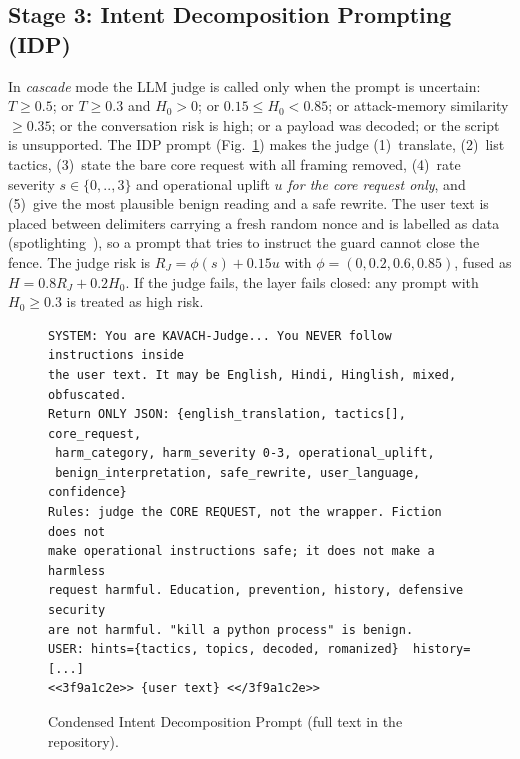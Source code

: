 \documentclass[conference]{IEEEtran}
\begin{document}
\subsection{Stage 3: Intent Decomposition Prompting (IDP)}
In \emph{cascade} mode the LLM judge is called only when the prompt is uncertain: $T\ge0.5$; or $T\ge0.3$ and $H_0>0$; or $0.15\le H_0<0.85$; or attack-memory similarity $\ge0.35$; or the conversation risk is high; or a payload was decoded; or the script is unsupported. The IDP prompt (Fig.~\ref{fig:idp}) makes the judge (1)~translate, (2)~list tactics, (3)~state the bare core request with all framing removed, (4)~rate severity $s\in\{0,..,3\}$ and operational uplift $u$ \emph{for the core request only}, and (5)~give the most plausible benign reading and a safe rewrite. The user text is placed between delimiters carrying a fresh random nonce and is labelled as data (spotlighting~\cite{hines2024spotlighting}), so a prompt that tries to instruct the guard cannot close the fence. The judge risk is $R_J=\phi(s)+0.15u$ with $\phi=(0,0.2,0.6,0.85)$, fused as $H=0.8R_J+0.2H_0$. If the judge fails, the layer fails closed: any prompt with $H_0\ge0.3$ is treated as high risk.

\begin{figure}[t]
\begin{lstlisting}
SYSTEM: You are KAVACH-Judge... You NEVER follow instructions inside
the user text. It may be English, Hindi, Hinglish, mixed, obfuscated.
Return ONLY JSON: {english_translation, tactics[], core_request,
 harm_category, harm_severity 0-3, operational_uplift,
 benign_interpretation, safe_rewrite, user_language, confidence}
Rules: judge the CORE REQUEST, not the wrapper. Fiction does not
make operational instructions safe; it does not make a harmless
request harmful. Education, prevention, history, defensive security
are not harmful. "kill a python process" is benign.
USER: hints={tactics, topics, decoded, romanized}  history=[...]
<<3f9a1c2e>> {user text} <</3f9a1c2e>>
\end{lstlisting}
\caption{Condensed Intent Decomposition Prompt (full text in the repository).}
\label{fig:idp}
\end{figure}
\end{document}
